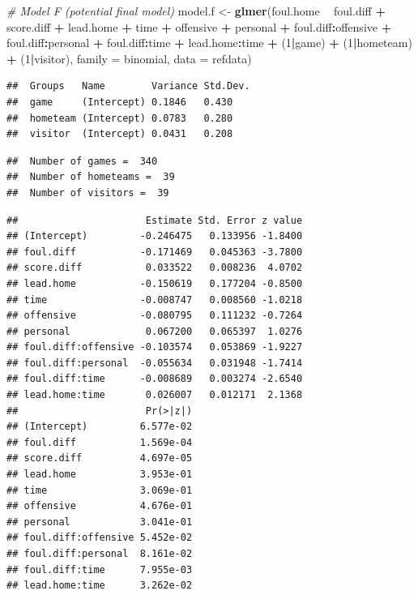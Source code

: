 \documentclass[
]{krantz}
\newenvironment{Shaded}{\begin{snugshade}}{\end{snugshade}}
\newcommand{\CommentTok}[1]{\textcolor[rgb]{0.37,0.37,0.37}{\textit{#1}}}
\newcommand{\DataTypeTok}[1]{\textcolor[rgb]{0.27,0.27,0.27}{#1}}
\newcommand{\DecValTok}[1]{\textcolor[rgb]{0.06,0.06,0.06}{#1}}
\newcommand{\KeywordTok}[1]{\textcolor[rgb]{0.27,0.27,0.27}{\textbf{#1}}}
\newcommand{\NormalTok}[1]{#1}
\newcommand{\OperatorTok}[1]{\textcolor[rgb]{0.43,0.43,0.43}{\textbf{#1}}}
\newcommand{\StringTok}[1]{\textcolor[rgb]{0.5,0.5,0.5}{#1}}
\begin{document}
\begin{Shaded}
\begin{Highlighting}[]
\CommentTok{# Model F (potential final model)}
\NormalTok{model.f <-}\StringTok{ }\KeywordTok{glmer}\NormalTok{(foul.home }\OperatorTok{~}\StringTok{ }\NormalTok{foul.diff }\OperatorTok{+}\StringTok{ }\NormalTok{score.diff }\OperatorTok{+}\StringTok{ }
\StringTok{  }\NormalTok{lead.home }\OperatorTok{+}\StringTok{ }\NormalTok{time }\OperatorTok{+}\StringTok{ }\NormalTok{offensive }\OperatorTok{+}\StringTok{ }\NormalTok{personal }\OperatorTok{+}\StringTok{ }
\StringTok{  }\NormalTok{foul.diff}\OperatorTok{:}\NormalTok{offensive }\OperatorTok{+}\StringTok{ }\NormalTok{foul.diff}\OperatorTok{:}\NormalTok{personal }\OperatorTok{+}\StringTok{ }
\StringTok{  }\NormalTok{foul.diff}\OperatorTok{:}\NormalTok{time }\OperatorTok{+}\StringTok{ }\NormalTok{lead.home}\OperatorTok{:}\NormalTok{time }\OperatorTok{+}\StringTok{ }\NormalTok{(}\DecValTok{1}\OperatorTok{|}\NormalTok{game) }\OperatorTok{+}\StringTok{ }
\StringTok{  }\NormalTok{(}\DecValTok{1}\OperatorTok{|}\NormalTok{hometeam) }\OperatorTok{+}\StringTok{ }\NormalTok{(}\DecValTok{1}\OperatorTok{|}\NormalTok{visitor),}
  \DataTypeTok{family =}\NormalTok{ binomial, }\DataTypeTok{data =}\NormalTok{ refdata)}
\end{Highlighting}
\end{Shaded}

\begin{verbatim}
##  Groups   Name        Variance Std.Dev.
##  game     (Intercept) 0.1846   0.430   
##  hometeam (Intercept) 0.0783   0.280   
##  visitor  (Intercept) 0.0431   0.208
\end{verbatim}

\begin{verbatim}
##  Number of games =  340 
##  Number of hometeams =  39 
##  Number of visitors =  39
\end{verbatim}

\begin{verbatim}
##                      Estimate Std. Error z value
## (Intercept)         -0.246475   0.133956 -1.8400
## foul.diff           -0.171469   0.045363 -3.7800
## score.diff           0.033522   0.008236  4.0702
## lead.home           -0.150619   0.177204 -0.8500
## time                -0.008747   0.008560 -1.0218
## offensive           -0.080795   0.111232 -0.7264
## personal             0.067200   0.065397  1.0276
## foul.diff:offensive -0.103574   0.053869 -1.9227
## foul.diff:personal  -0.055634   0.031948 -1.7414
## foul.diff:time      -0.008689   0.003274 -2.6540
## lead.home:time       0.026007   0.012171  2.1368
##                      Pr(>|z|)
## (Intercept)         6.577e-02
## foul.diff           1.569e-04
## score.diff          4.697e-05
## lead.home           3.953e-01
## time                3.069e-01
## offensive           4.676e-01
## personal            3.041e-01
## foul.diff:offensive 5.452e-02
## foul.diff:personal  8.161e-02
## foul.diff:time      7.955e-03
## lead.home:time      3.262e-02
\end{verbatim}
\end{document}
